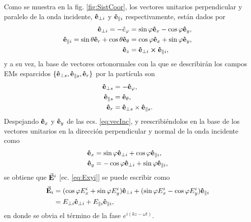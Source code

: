 Como se muestra en la fig. \ref{fig:SistCoor}, los vectores unitarios perpendicular y paralelo de la onda incidente, $\vu{e}_{\perp i}$ y $\vu{e}_{\parallel i}$ respectivamente, están dados por
	\begin{subequations}
	\begin{align}
	\vu{e}_{\perp i}=- \hat{e}_\varphi & = \sin\varphi\vu{e}_x - \cos\varphi\vu{e}_y,\\
	\vu{e}_{\parallel i}= \sin\theta\vu{e}_r + \cos\theta\vu{e}_\theta& = \cos\varphi\vu{e}_x + \sin\varphi\vu{e}_y,\\
	\vu{e}_z &= \vu{e}_{\perp i} \cross \vu{e}_{\parallel i},
	\end{align}\label{eq:vecInc}
	\end{subequations}
y a su vez, la base de vectores ortonormales con la que se describirán los campos EMs esparcidos $\{\vu{e}_{\perp s},\vu{e}_{\parallel s},\vu{e}_r \}$ por la partícula son
	\begin{subequations}
	\begin{align}
	\vu{e}_{\perp s}&= - \vu{e}_\varphi,\\
	\vu{e}_{\parallel s} &= \vu{e}_\theta,\\
	\vu{e}_r& = \vu{e}_{\perp s} \times \vu{e}_{\parallel s}.
	\end{align}\label{eq:vecScat}
	\end{subequations}
Despejando $\vu{e}_x$ y $\vu{e}_y$  de las ecs. \eqref{eq:vecInc}, y reescribiéndolos en la base de los vectores unitarios en la dirección perpendicular y normal de la onda incidente  como
\begin{align*}
\vu{e}_x &= \sin\varphi\vu{e}_{\perp i} + \cos\varphi\vu{e}_{\parallel i},\\
\vu{e}_y &= - \cos\varphi \vu{e}_{\perp i} + \sin\varphi\vu{e}_{\parallel i},
\end{align*}
se obtiene que $\va{E}^i$ [ec. \eqref{eq:Exyi}] se puede escribir como
\begin{align*}
\va{E}_i &= (\cos\varphi E_{x}^i + \sin\varphi E_{y}^i)\vu{e}_{\perp i} +
			 (\sin\varphi E_{x}^i - \cos\varphi E_{y}^i)\vu{e}_{\parallel i}\\
		&= E_{\perp i}  \vu{e}_{\perp i} + E_{\parallel i}\vu{e}_{\parallel i},
\end{align*}
en donde se obvia el término de la fase $e^{i(kz - \omega t)}$.\\







